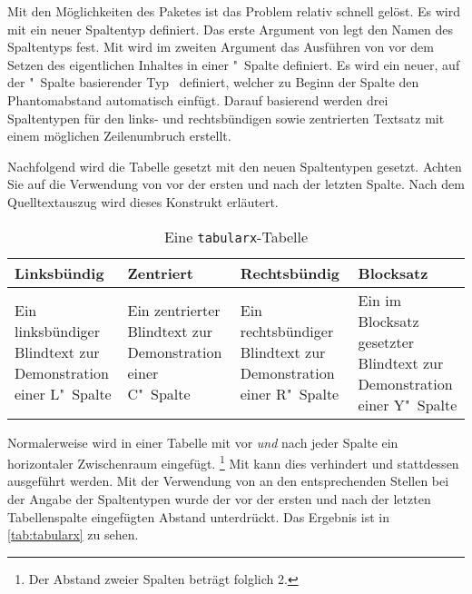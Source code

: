 \documentclass[%
  english,ngerman,%
  geometry=no,DIV=12,automark,%
]{tudscrartcl}
\begin{document}
Mit den Möglichkeiten des Paketes  ist das Problem relativ 
schnell gelöst. Es wird mit  ein neuer Spaltentyp 
definiert. Das erste Argument von  legt den Namen des 
Spaltentyps fest. Mit  wird im 
zweiten Argument das Ausführen von  vor dem Setzen des 
eigentlichen Inhaltes in einer "~Spalte definiert. Es wird ein 
neuer, auf der "~Spalte basierender Typ~ definiert, welcher 
zu Beginn der Spalte den Phantomabstand automatisch einfügt. Darauf basierend 
werden drei Spaltentypen für den links- und rechtsbündigen sowie zentrierten 
Textsatz mit einem möglichen Zeilenumbruch erstellt.
%
\InputHook{\renewcommand*{\newcolumntype}[2]{}}
\begin{Excerpt}
\end{Excerpt}
%
Nachfolgend wird die Tabelle gesetzt mit den neuen Spaltentypen gesetzt. Achten 
Sie auf die Verwendung von  vor der ersten und nach der letzten 
Spalte. Nach dem Quelltextauszug wird dieses Konstrukt erläutert.
%
\begin{Excerpt*}
\begin{table}
\begin{tabularx}{\textwidth}{@{}LCRY@{}}
\toprule
\textbf{Linksbündig} & \textbf{Zentriert} & 
\textbf{Rechtsbündig} & \textbf{Blocksatz} \tabularnewline
\midrule
Ein linksbündiger Blindtext zur Demonstration einer L"~Spalte &
Ein zentrierter Blindtext zur Demonstration einer C"~Spalte &
Ein rechtsbündiger Blindtext zur Demonstration einer R"~Spalte &
Ein im Blocksatz gesetzter Blindtext zur Demonstration einer Y"~Spalte
\tabularnewline
\bottomrule
\end{tabularx}
\caption{Eine \texttt{tabularx}-Tabelle}\label{tab:tabularx}
\end{table}
\end{Excerpt*}
\InputExcerpt
%
Normalerweise wird in einer Tabelle mit  vor 
\emph{und} nach jeder Spalte ein horizontaler Zwischenraum eingefügt.%
\footnote{Der Abstand zweier Spalten beträgt folglich 2.}
Mit  kann dies verhindert und stattdessen  
 ausgeführt werden. Mit der Verwendung von  
an den entsprechenden Stellen bei der Angabe der Spaltentypen wurde der vor der 
ersten und nach der letzten Tabellenspalte eingefügten Abstand unterdrückt.
Das Ergebnis ist in \autoref{tab:tabularx} zu sehen.
\end{document}
